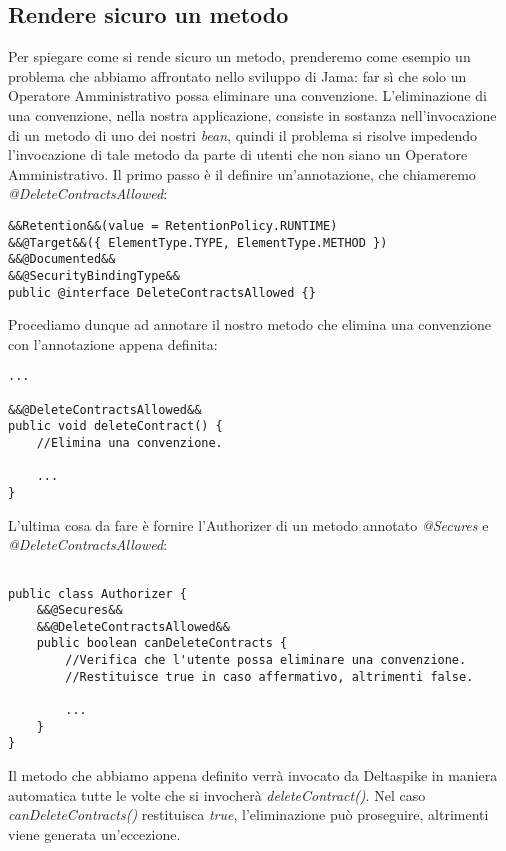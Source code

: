 \subsection{Rendere sicuro un metodo}
Per spiegare come si rende sicuro un metodo, prenderemo come esempio un problema che abbiamo affrontato nello sviluppo di Jama: far sì che solo un Operatore Amministrativo possa eliminare una convenzione. L'eliminazione di una convenzione, nella nostra applicazione, consiste in sostanza nell'invocazione di un metodo di uno dei nostri \textit{bean}, quindi il problema si risolve impedendo l'invocazione di tale metodo da parte di utenti che non siano un Operatore Amministrativo.\newline
Il primo passo è il definire un'annotazione, che chiameremo \textsl{@DeleteContractsAllowed}:

\begin{lstlisting}
&&Retention&&(value = RetentionPolicy.RUNTIME)
&&@Target&&({ ElementType.TYPE, ElementType.METHOD })
&&@Documented&&
&&@SecurityBindingType&&
public @interface DeleteContractsAllowed {}
\end{lstlisting}

Procediamo dunque ad annotare il nostro metodo che elimina una convenzione con l'annotazione appena definita:

\begin{lstlisting}
...

&&@DeleteContractsAllowed&&
public void deleteContract() {
	//Elimina una convenzione.
	
	...
}
\end{lstlisting}

L'ultima cosa da fare è fornire l'Authorizer di un metodo annotato \textsl{@Secures} e \textsl{@DeleteContractsAllowed}:

\begin{lstlisting}

public class Authorizer {
	&&@Secures&&
	&&@DeleteContractsAllowed&&
	public boolean canDeleteContracts {
		//Verifica che l'utente possa eliminare una convenzione.
		//Restituisce true in caso affermativo, altrimenti false.
	
		...
	}
}
\end{lstlisting}

Il metodo che abbiamo appena definito verrà invocato da Deltaspike in maniera automatica tutte le volte che si invocherà \textsl{deleteContract()}. Nel caso \textsl{canDeleteContracts()} restituisca \textsl{true}, l'eliminazione può proseguire, altrimenti viene generata un'eccezione.

